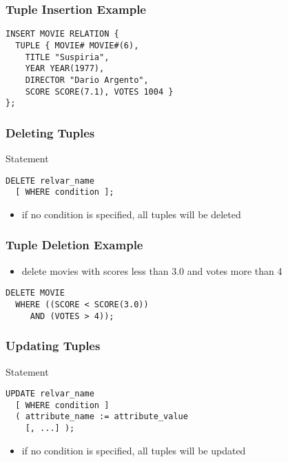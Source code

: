 \documentclass[dvipsnames]{beamer}
\theoremstyle{plain}
\begin{document}
\begin{frame}[fragile]
  \frametitle{Tuple Insertion Example}

  \begin{example}
    \begin{lstlisting}
INSERT MOVIE RELATION {
  TUPLE { MOVIE# MOVIE#(6),
    TITLE "Suspiria",
    YEAR YEAR(1977),
    DIRECTOR "Dario Argento",
    SCORE SCORE(7.1), VOTES 1004 }
};
    \end{lstlisting}
  \end{example}
\end{frame}

\begin{frame}[fragile]
  \frametitle{Deleting Tuples}

  \begin{block}{Statement}
    \begin{lstlisting}
DELETE relvar_name
  [ WHERE condition ];
    \end{lstlisting}
  \end{block}

  \pause
  \begin{itemize}
    \item if no condition is specified, all tuples will be deleted
  \end{itemize}
\end{frame}

\begin{frame}[fragile]
  \frametitle{Tuple Deletion Example}

  \begin{example}
    \begin{itemize}
      \item delete movies with scores less than 3.0 and votes more than 4
    \end{itemize}

    \begin{lstlisting}
DELETE MOVIE
  WHERE ((SCORE < SCORE(3.0))
     AND (VOTES > 4));
    \end{lstlisting}
  \end{example}
\end{frame}

\begin{frame}[fragile]
  \frametitle{Updating Tuples}

  \begin{block}{Statement}
    \begin{lstlisting}
UPDATE relvar_name
  [ WHERE condition ]
  ( attribute_name := attribute_value
    [, ...] );
    \end{lstlisting}
  \end{block}

  \pause
  \begin{itemize}
    \item if no condition is specified, all tuples will be updated
  \end{itemize}
\end{frame}
\end{document}
